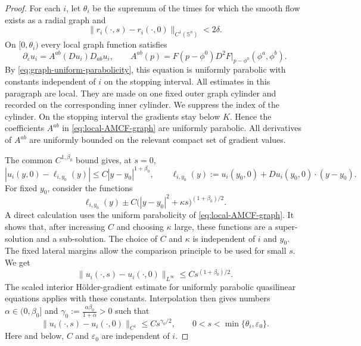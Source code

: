 \documentclass[10pt,a4paper]{amsart}
\numberwithin{equation}{section}
\begin{document}
\begin{proof}
For each $i$, let $\theta_i$ be the supremum of the times for which the smooth flow exists as a radial graph and
\begin{equation*}
 \|r_i(\cdot,s)-r_i(\cdot,0)\|_{C^1(\mathbb S^n)}<2\delta.
\end{equation*}
On $[0,\theta_i)$ every local graph function satisfies
\begin{equation}
\label{eq:local-AMCF-graph}
 \partial_\varepsilon u_i
 =A^{ab}(Du_i)D_{ab}u_i,
 \qquad
 A^{ab}(p)=F(p-\phi^0)
 D^2F|_{p-\phi^0}(\phi^a,\phi^b).
\end{equation}
By \eqref{eq:graph-uniform-parabolicity}, this equation is uniformly parabolic with constants independent of $i$ on the stopping interval. 
All estimates in this paragraph are local. They are made on one fixed outer graph cylinder and recorded on the corresponding inner cylinder. We suppress the index of the cylinder. On the stopping interval the gradients stay below $K$. Hence the coefficients $A^{ab}$ in \eqref{eq:local-AMCF-graph} are uniformly parabolic. All derivatives of $A^{ab}$ are uniformly bounded on the relevant compact set of gradient values.

The common $C^{1,\beta_0}$ bound gives, at $s=0$,
\begin{equation*}
 |u_i(y,0)-\ell_{i,y_0}(y)|\leq C|y-y_0|^{1+\beta_0},
 \qquad
 \ell_{i,y_0}(y):=u_i(y_0,0)+Du_i(y_0,0)\cdot(y-y_0).
\end{equation*}
For fixed $y_0$, consider the functions
\begin{equation*}
 \ell_{i,y_0}(y)\pm C\bigl(|y-y_0|^2+\kappa s\bigr)^{(1+\beta_0)/2}.
\end{equation*}
A direct calculation uses the uniform parabolicity of \eqref{eq:local-AMCF-graph}. It shows that, after increasing $C$ and choosing $\kappa$ large, these functions are a super-solution and a sub-solution. The choice of $C$ and $\kappa$ is independent of $i$ and $y_0$. The fixed lateral margins allow the comparison principle to be used for small $s$. We get
\begin{equation*}
 \|u_i(\cdot,s)-u_i(\cdot,0)\|_{L^\infty}
 \leq C s^{(1+\beta_0)/2}.
\end{equation*}
The scaled interior H\"older-gradient estimate for uniformly parabolic quasilinear equations \cite[Theorem~12.3]{Lie96} applies with these constants. Interpolation then gives numbers $\alpha\in(0,\beta_0]$ and $\gamma_0:=\frac{\alpha\beta_0}{1+\alpha}>0$ such that
\begin{equation}
\label{eq:C1-initial-modulus}
 \|u_i(\cdot,s)-u_i(\cdot,0)\|_{C^1}
 \leq C s^{\gamma_0/2},
 \qquad 0<s<\min\{\theta_i,\varepsilon_0\}.
\end{equation}
Here and below, $C$ and $\varepsilon_0$ are independent of $i$.


\end{proof}
\end{document}
